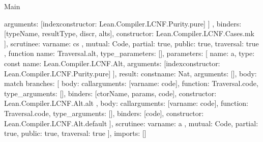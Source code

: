 \begin{lexlean}{Main}
\begin{toolingmodule}
{{{{{{                  arguments: [index{constructor: Lean.Compiler.LCNF.Purity.pure}]
                }
              ]
            },
            binders: [typeName, resultType, discr, alts],
            constructor: Lean.Compiler.LCNF.Cases.mk
          }
        ],
        scrutinee: var{name: cs}
      },
      mutual: Code,
      partial: true,
      public: true,
      traversal: true
    },
    function{
      name: Traversal.alt,
      type_parameters: [],
      parameters: [
        {
          name: a,
          type: const{
            name: Lean.Compiler.LCNF.Alt,
            arguments: [index{constructor: Lean.Compiler.LCNF.Purity.pure}]
          }
        }
      ],
      result: const{name: Nat, arguments: []},
      body: match{
        branches: [
          {
            body: call{arguments: [var{name: code}], function: Traversal.code, type_arguments: []},
            binders: [ctorName, params, code],
            constructor: Lean.Compiler.LCNF.Alt.alt
          },
          {
            body: call{arguments: [var{name: code}], function: Traversal.code, type_arguments: []},
            binders: [code],
            constructor: Lean.Compiler.LCNF.Alt.default
          }
        ],
        scrutinee: var{name: a}
      },
      mutual: Code,
      partial: true,
      public: true,
      traversal: true
    }
  ],
  imports: []
}
\end{toolingmodule}
\end{lexlean}
